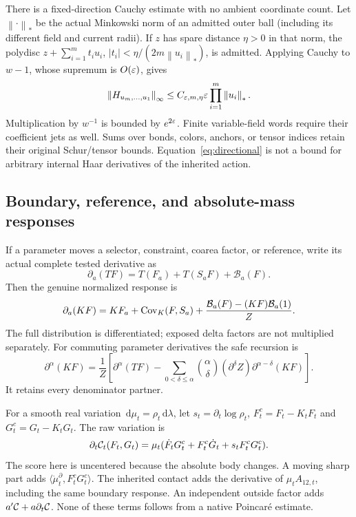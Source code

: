 \documentclass[11pt,letterpaper]{article}
\theoremstyle{plain}
\theoremstyle{remark}\newtheorem{remark}[theorem]{Scope}
\newcommand{\dd}{\,\mathrm d}\newcommand{\OH}{\mathcal O_H}
\newcommand{\norm}[1]{\left\lVert#1\right\rVert}
\begin{document}
There is a fixed-direction Cauchy estimate with no ambient coordinate count.
Let $\norm\cdot_*$ be the actual Minkowski norm of an admitted outer ball
(including its different field and current radii). If $z$ has spare distance
$\eta>0$ in that norm, the polydisc
$z+\sum_{i=1}^m t_iu_i$, $|t_i|<\eta/(2m\norm{u_i}_*)$, is admitted.
Applying Cauchy to $w-1$, whose supremum is $O(\varepsilon)$, gives
\begin{equation}
\norm{H_{u_m,\ldots,u_1}}_\infty
\le C_{\eps,m,\eta}\eps\prod_{i=1}^m\norm{u_i}_*.
\label{eq:directional}
\end{equation}
Multiplication by $w^{-1}$ is bounded by $e^{2\varepsilon}$. Finite variable-field
words require their coefficient jets as well. Sums over bonds, colors,
anchors, or tensor indices retain their original Schur/tensor bounds.
Equation~\eqref{eq:directional} is not a bound for arbitrary internal Haar
derivatives of the inherited action.

\subsection{Boundary, reference, and absolute-mass responses}

If a parameter moves a selector, constraint, coarea factor, or reference,
write its actual complete tested derivative as
\begin{equation}
\partial_a(TF)=T(F_a)+T(S_aF)+\mathcal B_a(F).
\end{equation}
Then the genuine normalized response is
\begin{equation}
\partial_a(KF)=KF_a+\operatorname{Cov}_K(F,S_a)
+\frac{\mathcal B_a(F)-(KF)\mathcal B_a(1)}{Z}.
\label{eq:boundaryquotient}
\end{equation}
The full distribution is differentiated; exposed delta factors are not
multiplied separately. For commuting parameter derivatives the safe recursion is
\begin{equation}
\partial^\alpha(KF)=\frac1Z\left[
\partial^\alpha(TF)-\sum_{0<\delta\le\alpha}\binom{\alpha}{\delta}
(\partial^\delta Z)\partial^{\alpha-\delta}(KF)\right].
\label{eq:quotientrecursive}
\end{equation}
It retains every denominator partner.

For a smooth real variation $\dd\mu_t=\rho_t\dd\lambda$, let
$s_t=\partial_t\log\rho_t$, $F_t^c=F_t-K_tF_t$ and
$G_t^c=G_t-K_tG_t$. The raw variation is
\begin{equation}
\partial_t\mathcal C_t(F_t,G_t)
=\mu_t(\dot F_tG_t^c+F_t^c\dot G_t+s_tF_t^cG_t^c).
\label{eq:rawscore}
\end{equation}
The score here is uncentered because the absolute body changes. A moving
sharp part adds $\langle\dot\mu_t^\partial,F_t^cG_t^c\rangle$.
The inherited contact adds the derivative of $\mu_t A_{12,t}$, including
the same boundary response. An independent outside factor adds
$a'\mathcal C+a\partial_t\mathcal C$. None of these terms follows from a native
Poincar\'e estimate.
\end{document}
